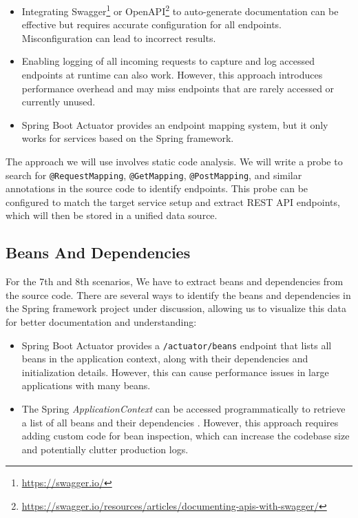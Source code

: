 \begin{itemize}
    \item Integrating Swagger\footnote{\url{https://swagger.io/}} or OpenAPI\footnote{\url{https://swagger.io/resources/articles/documenting-apis-with-swagger/}} to auto-generate documentation can be effective but requires accurate configuration for all endpoints. Misconfiguration can lead to incorrect results.
    \item Enabling logging of all incoming requests to capture and log accessed endpoints at runtime can also work. However, this approach introduces performance overhead and may miss endpoints that are rarely accessed or currently unused.
    \item Spring Boot Actuator provides an endpoint mapping system, but it only works for services based on the Spring framework.
\end{itemize}

The approach we will use involves static code analysis. We will write a probe to search for \texttt{@RequestMapping}, \texttt{@GetMapping}, \texttt{@PostMapping}, and similar annotations in the source code to identify endpoints. This probe can be configured to match the target service setup and extract REST API endpoints, which will then be stored in a unified data source.

\subsection{Beans And Dependencies}

For the 7th and 8th scenarios, We have to extract beans and dependencies from the source code. There are several ways to identify the beans and dependencies in the Spring framework project under discussion, allowing us to visualize this data for better documentation and understanding:

\begin{itemize}
    \item Spring Boot Actuator provides a \texttt{/actuator/beans} endpoint that lists all beans in the application context, along with their dependencies and initialization details. However, this can cause performance issues in large applications with many beans.
    \item The Spring \textit{ApplicationContext} can be accessed programmatically to retrieve a list of all beans and their dependencies \citep{baeldung_applicationcontext}. However, this approach requires adding custom code for bean inspection, which can increase the codebase size and potentially clutter production logs.
\end{itemize}

